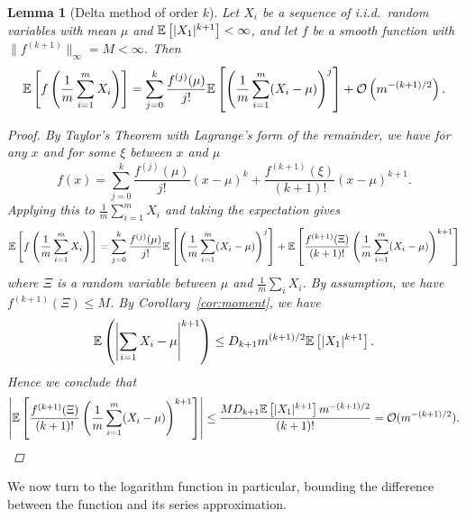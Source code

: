 \documentclass[a4paper, 10pt]{report}
\theoremstyle{plain}
\newtheorem{lemma}[theorem]{Lemma}
\begin{document}
	\begin{lemma}[Delta method of order $k$]
		\label{lemma:delta}
		Let $X_i$ be a sequence of i.i.d.~random variables  with mean $\mu$ and $\mathbb{E}\left[|X_1|^{k+1}\right]<\infty$, and let $f$ be a smooth function with $\|f^{(k+1)}\|_\infty = M <\infty$.
		Then
		\begin{equation}
		\mathbb{E}\left[ f\left( \frac{1}{m} \sum_{i=1}^m X_i \right) \right] = \sum_{j=0}^k  \frac{f^{(j)}(\mu)}{j!}\mathbb{E}\left[ \left( \frac{1}{m}\sum_{i=1}^m (X_i-\mu) \right)^j \right] + \mathcal{O}\left( m^{-(k+1)/2} \right).
		\end{equation}
		\begin{proof}
			By Taylor's Theorem with Lagrange's form of the remainder, we have for any $x$ and for some $\xi$ between $x$ and $\mu$
			\begin{equation}
			f(x) = \sum_{j=0}^k  \frac{f^{(j)}(\mu)}{j!}(x-\mu)^k + \frac{f^{(k+1)}(\xi)}{(k+1)!}(x-\mu)^{k+1}.
			\end{equation}
			Applying this to $\frac{1}{m}\sum_{i=1}^m X_i$ and taking the expectation gives
			\begin{equation}
			\label{eq:mainxi}
			\mathbb{E}\left[ f\left( \frac{1}{m} \sum_{i=1}^m X_i \right) \right] = \sum_{j=0}^k  \frac{f^{(j)}(\mu)}{j!}\mathbb{E}\left[\left(\frac{1}{m}\sum_{i=1}^m (X_i-\mu)\right)^j \right] + \mathbb{E}\left[\frac{f^{(k+1)}(\Xi)}{(k+1)!}\left(\frac{1}{m}\sum_{i=1}^m (X_i-\mu)\right)^{k+1} \right]
			\end{equation}
			where $\Xi$ is a random variable between $\mu$ and $\frac{1}{m}\sum_i X_i$. By assumption, we have $f^{(k+1)}(\Xi)\le M$. By Corollary~\ref{cor:moment}, we have
			\begin{align}
			\mathbb{E}\left(\left|\sum_{i=1} X_i - \mu \right|^{k+1} \right)\le D_{k+1}m^{(k+1)/2}\mathbb{E}\left[|X_1|^{k+1}\right].
			\end{align}
			Hence we conclude that 
			\begin{equation}
			\left|\mathbb{E}\left[\frac{f^{(k+1)}(\Xi)}{(k+1)!}\left(\frac{1}{m}\sum_{i=1}^m (X_i-\mu)\right)^{k+1} \right]\right| \le \frac{MD_{k+1}\mathbb{E}\left[|X_1|^{k+1}\right]m^{-(k+1)/2}}{(k+1)!} = \mathcal{O}(m^{-(k+1)/2}).
			\end{equation}
		\end{proof}
	\end{lemma}
	We now turn to the logarithm function in particular, bounding the difference between the function and its series approximation.
\end{document}
